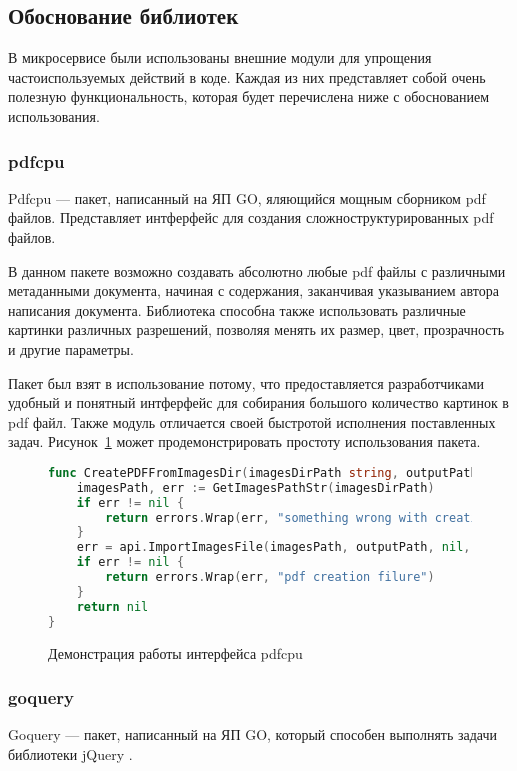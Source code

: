 \subsection{Обоснование библиотек}

В микросервисе были использованы внешние модули для упрощения частоиспользуемых действий в коде.
Каждая из них представляет собой очень полезную функциональность, которая будет перечислена ниже с обоснованием использования.

\subsubsection{pdfcpu}
Pdfcpu \cite{pdfcpu-cite} --- пакет, написанный на ЯП GO, яляющийся мощным сборником pdf файлов. Представляет интферфейс для создания сложноструктурированных pdf файлов.

В данном пакете возможно создавать абсолютно любые pdf файлы с различными метаданными документа, начиная с содержания, заканчивая указыванием автора написания документа.
Библиотека способна также использовать различные картинки различных разрешений, позволяя менять их размер, цвет, прозрачность и другие параметры.

Пакет был взят в использование потому, что предоставляется разработчиками удобный и понятный интферфейс для собирания большого количество картинок в pdf файл. 
Также модуль отличается своей быстротой исполнения поставленных задач. Рисунок~\ref{libs-pdfcpu} может продемонстрировать простоту использования пакета.

\begin{figure}
\begin{lstlisting}[language=go]
func CreatePDFFromImagesDir(imagesDirPath string, outputPath string) error {
	imagesPath, err := GetImagesPathStr(imagesDirPath)
	if err != nil {
		return errors.Wrap(err, "something wrong with creating images path")
	}
	err = api.ImportImagesFile(imagesPath, outputPath, nil, nil)
	if err != nil {
		return errors.Wrap(err, "pdf creation filure")
	}
	return nil
}
\end{lstlisting}
\caption{Демонстрация работы интерфейса pdfcpu}
\label{libs-pdfcpu}
\end{figure}


\subsubsection{goquery}
Goquery \cite{goquery-cite} --- пакет, написанный на ЯП GO, который способен выполнять задачи библиотеки jQuery \cite{jquery-cite}. 

